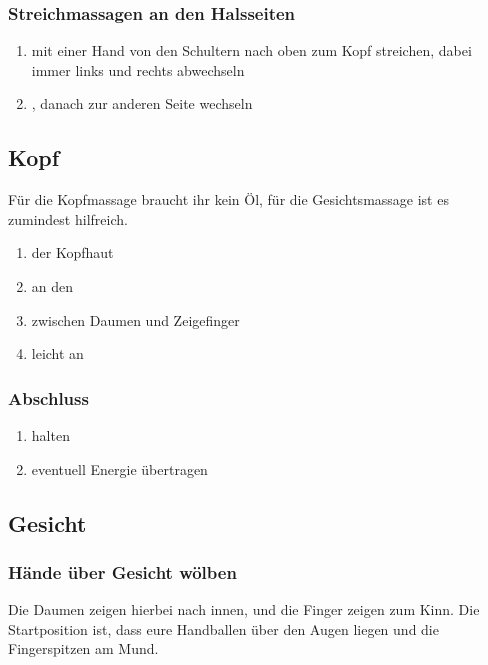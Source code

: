 \subsubsection{Streichmassagen an den Halsseiten}

\begin{enumerate}
  \item {} mit einer Hand von den Schultern nach oben zum Kopf streichen, dabei immer links und rechts abwechseln
  \item {}, danach zur anderen Seite wechseln
\end{enumerate}

\pagebreak
\subsection{Kopf}

Für die Kopfmassage braucht ihr kein Öl, für die Gesichtsmassage ist es zumindest hilfreich.

\begin{enumerate}
  \item {} der Kopfhaut
  \item an den 
  \item {} zwischen Daumen und Zeigefinger 
  \item leicht an 
\end{enumerate}

\subsubsection{Abschluss}
\begin{enumerate}
  \item {} halten
  \item eventuell Energie übertragen
\end{enumerate}


\subsection{Gesicht}

\subsubsection{Hände über Gesicht wölben}

Die Daumen zeigen hierbei nach innen, und die Finger zeigen zum Kinn. Die Startposition ist, dass eure Handballen über den Augen liegen und die Fingerspitzen am Mund.


